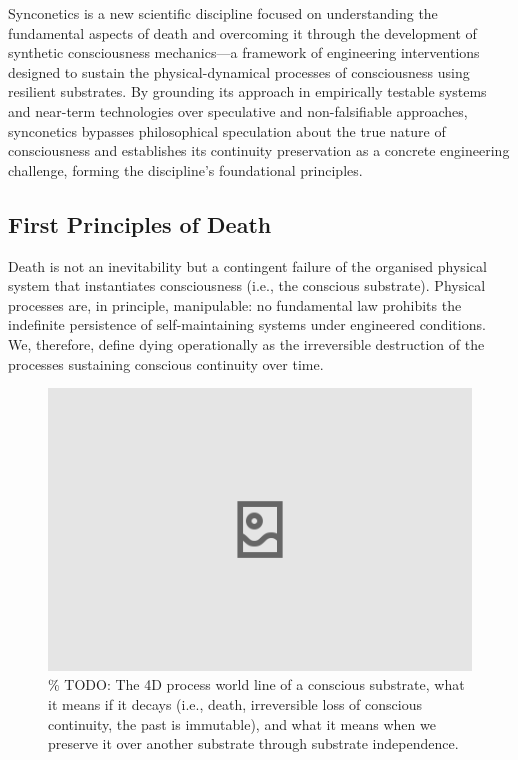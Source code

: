 \documentclass[10pt]{article}
\begin{document}
\begin{sloppypar}
  Synconetics is a new scientific discipline focused on understanding the fundamental aspects of death and overcoming it through the development of synthetic consciousness mechanics—a framework of engineering interventions designed to sustain the physical-dynamical processes of consciousness using resilient substrates. By grounding its approach in empirically testable systems and near-term technologies over speculative and non-falsifiable approaches, synconetics bypasses philosophical speculation about the true nature of consciousness and establishes its continuity preservation as a concrete engineering challenge, forming the discipline’s foundational principles.

  \subsection{First Principles of Death}
  \label{sec:first-principles}

  Death is not an inevitability but a contingent failure of the organised physical system that instantiates consciousness (i.e., the conscious substrate). Physical processes are, in principle, manipulable: no fundamental law prohibits the indefinite persistence of self-maintaining systems under engineered conditions. We, therefore, define dying operationally as the irreversible destruction of the processes sustaining conscious continuity over time.

  \begin{figure}[ht!]
    \centering
    \includegraphics[width=\textwidth]{figures/4D-process-world-line-ending.png}
    \caption{\% TODO: The 4D process world line of a conscious substrate, what it means if it decays (i.e., death, irreversible loss of conscious continuity, the past is immutable), and what it means when we preserve it over another substrate through substrate independence.}
    \label{fig:process-world-line-ending}
  \end{figure}


\end{sloppypar}
\end{document}
